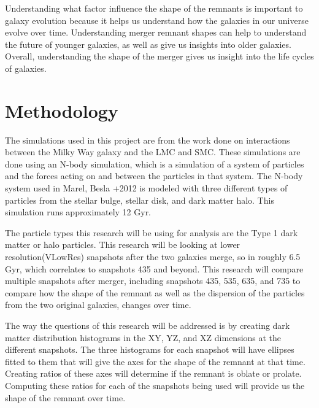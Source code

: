 \documentclass[linenumbers,trackchanges]{aastex7}
\begin{document}
Understanding what factor influence the shape of the remnants is important to galaxy evolution because it helps us understand how the galaxies in our universe evolve over time. Understanding merger remnant shapes can help to understand the future of younger galaxies, as well as give us insights into older galaxies. Overall, understanding the shape of the merger gives us insight into the life cycles of galaxies.

\section{Methodology} \label{sec:style}

The simulations used in this project are from the work done on interactions between the Milky Way galaxy and the LMC and SMC.\cite{2012MNRAS.421.2109B} These simulations are done using an N-body simulation, which is a simulation of a system of particles and the forces acting on and between the particles in that system. The N-body system used in Marel, Besla +2012 is modeled with three different types of particles from the stellar bulge, stellar disk, and dark matter halo. This simulation runs approximately 12 Gyr.

The particle types this research will be using for analysis are the Type 1 dark matter or halo particles. This research will be looking at lower resolution(VLowRes) snapshots after the two galaxies merge, so in roughly 6.5 Gyr, which correlates to snapshots 435 and beyond. This research will compare multiple snapshots after merger, including snapshots 435, 535, 635, and 735 to compare how the shape of the remnant as well as the dispersion of the particles from the two original galaxies, changes over time. 

The way the questions of this research will be addressed is by creating dark matter distribution histograms in the XY, YZ, and XZ dimensions at the different snapshots. The three histograms for each snapshot will have ellipses fitted to them that will give the axes for the shape of the remnant at that time. Creating ratios of these axes will determine if the remnant is oblate or prolate. Computing these ratios for each of the snapshots being used will provide us the shape of the remnant over time. 
\end{document}
